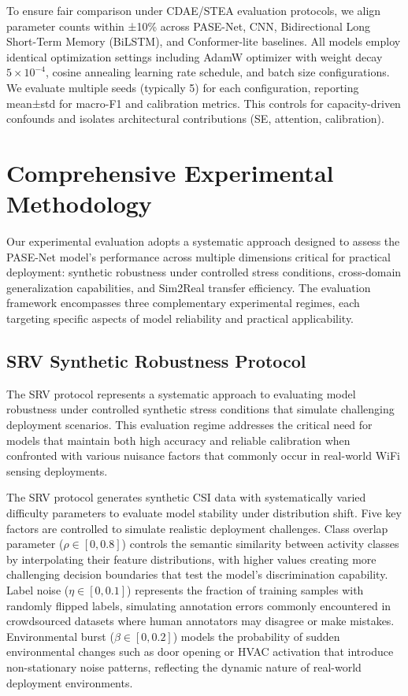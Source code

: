 \documentclass[lettersize,journal]{IEEEtran}
\begin{document}
To ensure fair comparison under CDAE/STEA evaluation protocols, we align parameter counts within ±10\% across PASE-Net, CNN, Bidirectional Long Short-Term Memory (BiLSTM), and Conformer-lite baselines. All models employ identical optimization settings including AdamW optimizer with weight decay $5 \times 10^{-4}$, cosine annealing learning rate schedule, and batch size configurations. We evaluate multiple seeds (typically 5) for each configuration, reporting mean±std for macro-F1 and calibration metrics. This controls for capacity-driven confounds and isolates architectural contributions (SE, attention, calibration).

\section{Comprehensive Experimental Methodology}

Our experimental evaluation adopts a systematic approach designed to assess the PASE-Net model's performance across multiple dimensions critical for practical deployment: synthetic robustness under controlled stress conditions, cross-domain generalization capabilities, and Sim2Real transfer efficiency. The evaluation framework encompasses three complementary experimental regimes, each targeting specific aspects of model reliability and practical applicability.

\subsection{SRV Synthetic Robustness Protocol}

The SRV protocol represents a systematic approach to evaluating model robustness under controlled synthetic stress conditions that simulate challenging deployment scenarios. This evaluation regime addresses the critical need for models that maintain both high accuracy and reliable calibration when confronted with various nuisance factors that commonly occur in real-world WiFi sensing deployments.

The SRV protocol generates synthetic CSI data with systematically varied difficulty parameters to evaluate model stability under distribution shift. Five key factors are controlled to simulate realistic deployment challenges. Class overlap parameter ($\rho \in [0, 0.8]$) controls the semantic similarity between activity classes by interpolating their feature distributions, with higher values creating more challenging decision boundaries that test the model's discrimination capability. Label noise ($\eta \in [0, 0.1]$) represents the fraction of training samples with randomly flipped labels, simulating annotation errors commonly encountered in crowdsourced datasets where human annotators may disagree or make mistakes. Environmental burst ($\beta \in [0, 0.2]$) models the probability of sudden environmental changes such as door opening or HVAC activation that introduce non-stationary noise patterns, reflecting the dynamic nature of real-world deployment environments.
\end{document}
